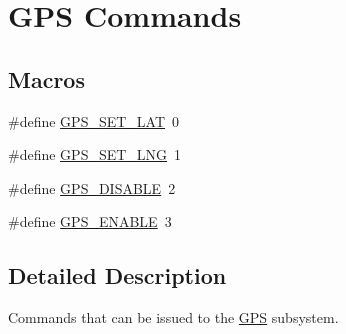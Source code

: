 \hypertarget{group__gps__commands}{\section{G\-P\-S Commands}
\label{group__gps__commands}
}
\subsection*{Macros}
\begin{DoxyCompactItemize}
\item 
\#define \hyperlink{group__gps__commands_gaac31d4fc4681381604fdbf78b5aa7599}{G\-P\-S\-\_\-\-S\-E\-T\-\_\-\-L\-A\-T}~0
\item 
\#define \hyperlink{group__gps__commands_gafe7ed49e1848a16fd15d1643b4c4c36b}{G\-P\-S\-\_\-\-S\-E\-T\-\_\-\-L\-N\-G}~1
\item 
\#define \hyperlink{group__gps__commands_ga8e394314aacedb0790203d4af6cd5710}{G\-P\-S\-\_\-\-D\-I\-S\-A\-B\-L\-E}~2
\item 
\#define \hyperlink{group__gps__commands_gac8383d8fc4fa97bb45f89d9a50e0966d}{G\-P\-S\-\_\-\-E\-N\-A\-B\-L\-E}~3
\end{DoxyCompactItemize}


\subsection{Detailed Description}
Commands that can be issued to the \hyperlink{classGPS}{G\-P\-S} subsystem. 

